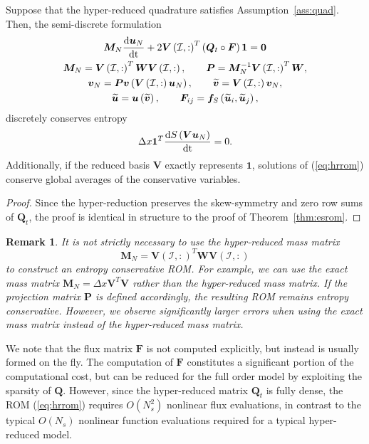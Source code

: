 \documentclass[review]{siamart171218}
\newtheorem*{remark}{Remark}
\theoremstyle{assumption}
\renewcommand{\tilde}{\widetilde}
\newcommand{\td}[2]{\frac{{\rm d}#1}{{\rm d}{\rm #2}}}
\newcommand{\LRp}[1]{\left( #1 \right)}
\newcommand{\note}[1]{{\color{blue}{#1}}}
\begin{document}
\begin{theorem}
Suppose that the hyper-reduced quadrature satisfies Assumption~\ref{ass:quad}.  Then, the semi-discrete formulation 
\begin{gather}
\bm{M}_N\td{\bm{u}_N}{t} + 2\bm{V}\LRp{\mathcal{I},:}^T\LRp{\bm{Q}_t \circ \bm{F}}\bm{1} = \bm{0} \label{eq:hrrom}\\
\bm{M}_N = \bm{V}\LRp{\mathcal{I},:}^T\bm{W}\bm{V}\LRp{\mathcal{I},:}, \qquad \bm{P} = \bm{M}_N^{-1}\bm{V}\LRp{\mathcal{I},:}^T\bm{W},\nonumber\\ 
\bm{v}_N = \bm{P}\bm{v}\LRp{\bm{V}\LRp{\mathcal{I},:}\bm{u}_N}, \qquad \tilde{\bm{v}} = \bm{V}\LRp{\mathcal{I},:}\bm{v}_N, \nonumber\\
\tilde{\bm{u}} = \bm{u}\LRp{\tilde{\bm{v}}}, \qquad \bm{F}_{ij} = \bm{f}_S\LRp{\tilde{\bm{u}}_i,\tilde{\bm{u}}_j},\nonumber
\end{gather}
discretely conserves entropy 
\[
\Delta x \bm{1}^T\td{S\LRp{\bm{V}\bm{u}_N}}{t} = 0.  
\]
Additionally, if the reduced basis $\bm{V}$ exactly represents $\bm{1}$, solutions of (\ref{eq:hrrom}) conserve global averages of the conservative variables.
\label{thm:hrromes}
\end{theorem}
\begin{proof}
Since the hyper-reduction preserves the skew-symmetry and zero row sums of $\bm{Q}_t$, the proof is identical in structure to the proof of Theorem~\ref{thm:esrom}.  
\end{proof}

\begin{remark}
It is not strictly necessary to use the hyper-reduced mass matrix 
\[
\bm{M}_N = \bm{V}\LRp{\mathcal{I},:}^T\bm{W}\bm{V}\LRp{\mathcal{I},:}
\]
 to construct an entropy conservative ROM.  For example, we can use the exact mass matrix $\bm{M}_N = \Delta x \bm{V}^T\bm{V}$ rather than the hyper-reduced mass matrix.  If the projection matrix $\bm{P}$ is defined accordingly, the resulting ROM remains entropy conservative.  However, we observe significantly larger errors when using the exact mass matrix instead of the hyper-reduced mass matrix.  
\end{remark}


We note that the flux matrix $\bm{F}$ is not computed explicitly, but instead is usually formed on the fly.  The computation of $\bm{F}$ constitutes a significant portion of the computational cost, but can be reduced for the full order model by exploiting the sparsity of $\bm{Q}$.  However, since the hyper-reduced matrix $\bm{Q}_t$ is fully dense, the ROM (\ref{eq:hrrom}) requires $O(N_s^2)$ nonlinear flux evaluations, in contrast to the typical $O(N_s)$ nonlinear function evaluations required for a typical hyper-reduced model.  
\end{document}
